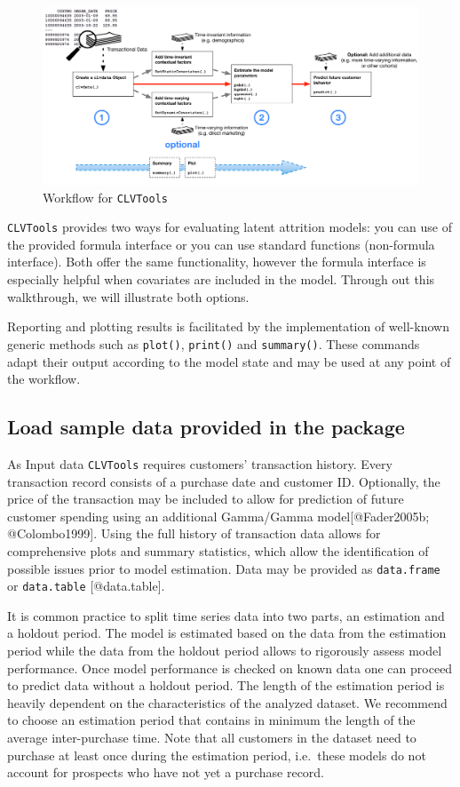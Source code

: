 \documentclass[
]{article}
\begin{document}
\begin{figure}
\centering
\includegraphics{figures/WALKTHROUGH-steps.pdf}
\caption{Workflow for \texttt{CLVTools}}
\end{figure}

\texttt{CLVTools} provides two ways for evaluating latent attrition
models: you can use of the provided formula interface or you can use
standard functions (non-formula interface). Both offer the same
functionality, however the formula interface is especially helpful when
covariates are included in the model. Through out this walkthrough, we
will illustrate both options.

Reporting and plotting results is facilitated by the implementation of
well-known generic methods such as \texttt{plot()}, \texttt{print()} and
\texttt{summary()}. These commands adapt their output according to the
model state and may be used at any point of the workﬂow.

\subsection{Load sample data provided in the
package}\label{load-sample-data-provided-in-the-package}

As Input data \texttt{CLVTools} requires customers' transaction history.
Every transaction record consists of a purchase date and customer ID.
Optionally, the price of the transaction may be included to allow for
prediction of future customer spending using an additional Gamma/Gamma
model{[}@Fader2005b; @Colombo1999{]}. Using the full history of
transaction data allows for comprehensive plots and summary statistics,
which allow the identification of possible issues prior to model
estimation. Data may be provided as \texttt{data.frame} or
\texttt{data.table} {[}@data.table{]}.

It is common practice to split time series data into two parts, an
estimation and a holdout period. The model is estimated based on the
data from the estimation period while the data from the holdout period
allows to rigorously assess model performance. Once model performance is
checked on known data one can proceed to predict data without a holdout
period. The length of the estimation period is heavily dependent on the
characteristics of the analyzed dataset. We recommend to choose an
estimation period that contains in minimum the length of the average
inter-purchase time. Note that all customers in the dataset need to
purchase at least once during the estimation period, i.e.~these models
do not account for prospects who have not yet a purchase record.
\end{document}
